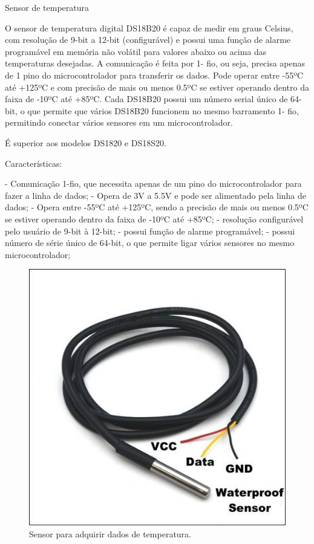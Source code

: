 Sensor de temperatura

O sensor de temperatura digital DS18B20 é capaz de medir em graus Celsius, com resolução de 9-bit a 12-bit (configurável) e possui uma função de alarme programável em memória não volátil para valores abaixo ou acima das temperaturas desejadas. A comunicação é feita por 1- fio, ou seja, precisa apenas de 1 pino do microcontrolador para transferir os dados. Pode operar entre -55ºC até +125ºC e com precisão de mais ou menos 0.5ºC se estiver operando dentro da faixa de -10ºC até +85ºC. Cada DS18B20 possui um número serial único de 64-bit, o que permite que vários DS18B20 funcionem no mesmo barramento 1- fio, permitindo conectar vários sensores em um microcontrolador.

É superior aos modelos DS1820 e DS18S20.

Características:

- Comunicação 1-fio, que necessita apenas de um pino do microcontrolador para fazer a linha de dados;
- Opera de 3V a 5.5V e pode ser alimentado pela linha de dados;
- Opera entre -55ºC até +125ºC, sendo a precisão de mais ou menos 0.5ºC se estiver operando dentro da faixa de -10ºC até +85ºC;
- resolução configurável pelo usuário de 9-bit à 12-bit;
- possui função de alarme programável;
- possui número de série único de 64-bit, o que permite ligar vários sensores no mesmo microcontrolador;

 \begin{figure} [!htp]
	\centering
	\includegraphics[scale=0.6]{figuras/sensortemp}
	\caption{Sensor para adquirir dados de temperatura.}
	\label{sensortemp}
\end{figure}
\FloatBarrier


